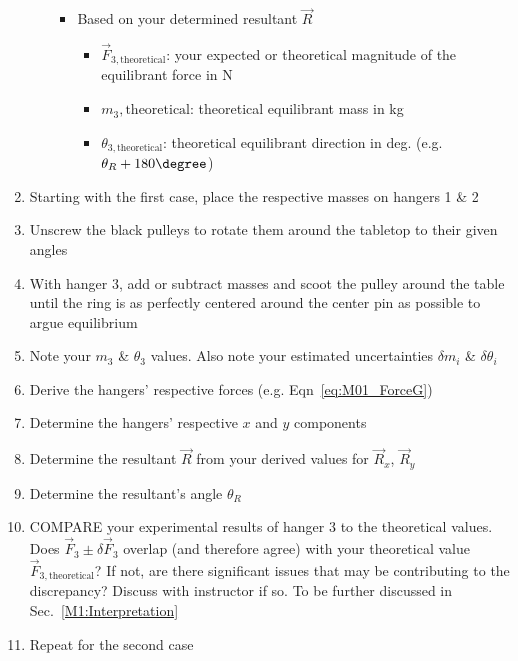\begin{enumerate}
\begin{itemize}
\begin{itemize}
        
        \item Based on your determined resultant $\vec{R}$
            \begin{itemize}
                \item $\vec{F}_{3,\text{theoretical}}$: your expected or theoretical magnitude of the equilibrant force in N
                \item $m_3,\text{theoretical}$: theoretical equilibrant mass in kg
                \item $\theta_{3,\text{theoretical}}$: theoretical equilibrant direction in deg. (e.g. $\theta_{R} + 180 \degree$)
            \end{itemize}
        
     


    \end{itemize} 
\end{itemize}


    \item Starting with the first case, place the respective masses on hangers 1 \& 2
    \item Unscrew the black pulleys to rotate them around the tabletop to their given angles
    \item With hanger 3, add or subtract masses and scoot the pulley around the table until the ring is as perfectly centered around the center pin as possible to argue equilibrium
    \item Note your $m_3$ \& $\theta_3$ values. Also note your estimated uncertainties $\delta m_i$ \& $\delta \theta_i$
    \item Derive the hangers' respective forces (e.g. Eqn~\ref{eq:M01_ForceG})
    \item Determine the hangers' respective $x$ and $y$ components
    \item Determine the resultant $\vec{R}$ from your derived values for $\vec{R}_x$, $\vec{R}_y$
    \item Determine the resultant's angle $\theta_R$
    \item COMPARE your experimental results of hanger 3 to the theoretical values. Does $\vec{F}_3 \pm \delta \vec{F}_3$ overlap (and therefore agree) with your theoretical value $\vec{F}_{3,\text{theoretical}}$? If not, are there significant issues that may be contributing to the discrepancy? Discuss with instructor if so. To be further discussed in Sec.~\ref{M1:Interpretation}
    \item Repeat for the second case
\end{enumerate}





